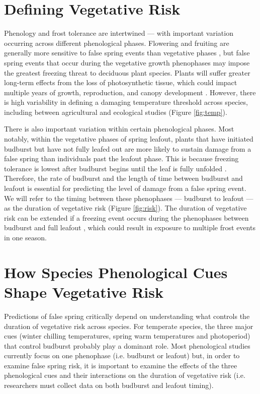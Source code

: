 \documentclass{article}\usepackage[]{graphicx}\usepackage[]{color}
\begin{document}
\section* {Defining Vegetative Risk} %
Phenology and frost tolerance are intertwined --- with important variation occurring across different phenological phases. Flowering and fruiting are generally more sensitive to false spring events than vegetative phases \citep{Augspurger2009, Lenz2013}, but false spring events that occur during the vegetative growth phenophases may impose the greatest freezing threat to deciduous plant species.  Plants will suffer greater long-term effects from the loss of photosynthetic tissue, which could impact multiple years of growth, reproduction, and canopy development \citep{Vitasse2014, Xie2015}. However, there is high variability in defining a damaging temperature threshold across species, including between agricultural and ecological studies (Figure \ref{fig:temp}).

There is also important variation within certain phenological phases. Most notably, within the vegetative phases of spring leafout, plants that have initiated budburst but have not fully leafed out are more likely to sustain damage from a false spring than individuals past the leafout phase. This is because freezing tolerance is lowest after budburst begins until the leaf is fully unfolded \citep{Lenz2016}. Therefore, the rate of budburst and the length of time between budburst and leafout is essential for predicting the level of damage from a false spring event. We will refer to the timing between these phenophases --- budburst to leafout --- as the duration of vegetative risk (Figure \ref{fig:risk}). The duration of vegetative risk can be extended if a freezing event occurs during the phenophases between budburst and full leafout \citep{Augspurger2009}, which could result in exposure to multiple frost events in one season.

\section* {How Species Phenological Cues Shape Vegetative Risk}
Predictions of false spring critically depend on understanding what controls the duration of vegetative risk across species. For temperate species, the three major cues (winter chilling temperatures, spring warm temperatures and photoperiod) that control budburst \citep%
{Chuine2010} probably play a dominant role. Most phenological studies currently focus on one phenophase (i.e. budburst or leafout) but, in order to examine false spring risk, it is important to examine the effects of the three phenological cues and their interactions on the duration of vegetative risk (i.e. researchers must collect data on both budburst and leafout timing).  
\end{document}
